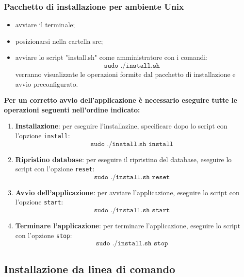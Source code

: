 \documentclass[12pt,a4paper]{article}
\begin{document}
		\subsubsection{Pacchetto di installazione per ambiente Unix}
		\begin{itemize}
			\item avviare il terminale;
			\item posizionarsi nella cartella src;
			\item avviare lo script "install.sh" come amministratore con i comandi:
		\[ 	\texttt{sudo  ./install.sh} \]
		verranno visualizzate le operazioni formite dal pacchetto di installazione e avvio preconfigurato.
	\end{itemize}
		\textbf{Per un corretto avvio dell'applicazione è necessario eseguire tutte le operazioni seguenti nell'ordine indicato:}
	\begin{enumerate}
		\item \textbf{Installazione}: per eseguire l'installazine, specificare dopo lo script con l'opzione \texttt{install}:
	 \[ 	\texttt{sudo  ./install.sh install} \]
		\item \textbf{Ripristino database}: per eseguire il ripristino del database, eseguire lo script con l'opzione \texttt{reset}:
		 \[ 	\texttt{sudo  ./install.sh reset} \]
		\item \textbf{Avvio dell'applicazione}: per avviare l'applicazione, eseguire lo script con l'opzione \texttt{start}:
		 \[ 	\texttt{sudo  ./install.sh start} \]
		\item \textbf{Terminare l'applicazione}: per terminare l'applicazione, eseguire lo script con l'opzione \texttt{stop}:
			 \[ 	\texttt{sudo  ./install.sh stop} \]
	
			

		\end{enumerate}
	\subsection{Installazione da linea di comando}
\end{document}
